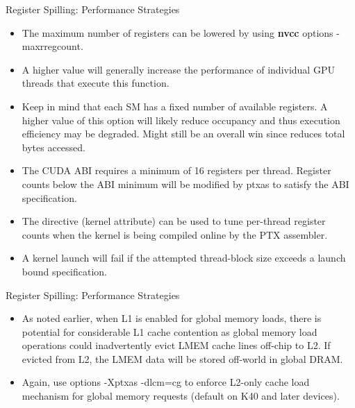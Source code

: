 \documentclass[handout]{beamer}
\begin{document}
\begin{frame}{Register Spilling: Performance Strategies}
\begin{itemize}
	\item<1->The maximum number of registers can be lowered by using {\selectfont \textbf{nvcc}} options {\selectfont -maxrregcount}. 
	\item<1->A higher value will generally increase the performance of individual GPU threads that execute this function. 
	\item<1->Keep in mind that each SM has a fixed number of available registers.  A higher value of this option will likely reduce occupancy and thus execution efficiency may be degraded.  Might still be an overall win since reduces total bytes accessed.
	\item<1->The CUDA ABI requires a minimum of 16 registers per thread.  Register counts below the ABI minimum will be  modified by {\selectfont ptxas} to satisfy the ABI specification.
	\item<1->The \href{http://docs.nvidia.com/cuda/cuda-c-programming-guide/index.html\#launch-bounds}{} directive (kernel attribute) can be used to tune per-thread register counts when the kernel is being compiled online by the PTX assembler.
	\item<1->A kernel launch will fail if the attempted thread-block size exceeds a launch bound specification.
\end{itemize}
\end{frame}

\begin{frame}{Register Spilling: Performance Strategies}
\begin{itemize}
\itemsep1em
	\item<1->As noted earlier, when L1 is enabled for global memory loads, there is potential for considerable L1 cache contention as global memory load operations could inadvertently evict LMEM cache lines off-chip to L2.  If evicted from L2, the LMEM data will be stored off-world in global DRAM. 
	\item<1->Again, use options {\selectfont -Xptxas -dlcm=cg} to enforce L2-only cache load mechanism for global memory requests (default on K40 and later devices).
\end{itemize}
\end{frame}
\end{document}

